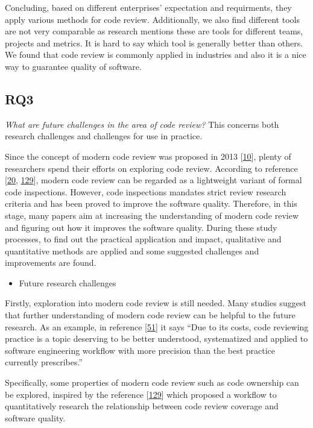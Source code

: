 \documentclass[]{book}
\providecommand{\tightlist}{%
  \setlength{\itemsep}{0pt}\setlength{\parskip}{0pt}}
\begin{document}
Concluding, based on different enterprises' expectation and requirments,
they apply various methods for code review. Additionally, we also find
different tools are not very comparable as research mentions these are
tools for different teams, projects and metrics. It is hard to say which
tool is generally better than others. We found that code review is
commonly applied in industries and also it is a nice way to guarantee
quality of software.

\subsection{RQ3}\label{rq3}

\emph{What are future challenges in the area of code review?} This
concerns both research challenges and challenges for use in practice.

Since the concept of modern code review was proposed in 2013
{[}\protect\hyperlink{ref-bacchelli2013expectations}{10}{]}, plenty of
researchers spend their efforts on exploring code review. According to
reference {[}\protect\hyperlink{ref-beller2014modern}{20},
\protect\hyperlink{ref-mcintosh2014impact}{129}{]}, modern code review
can be regarded as a lightweight variant of formal code inspections.
However, code inspections mandates strict review research criteria and
has been proved to improve the software quality. Therefore, in this
stage, many papers aim at increasing the understanding of modern code
review and figuring out how it improves the software quality. During
these study processes, to find out the practical application and impact,
qualitative and quantitative methods are applied and some suggested
challenges and improvements are found.

\begin{itemize}
\tightlist
\item
  Future research challenges
\end{itemize}

Firstly, exploration into modern code review is still needed. Many
studies suggest that further understanding of modern code review can be
helpful to the future research. As an example, in reference
{[}\protect\hyperlink{ref-czerwonka2015code}{51}{]} it says ``Due to its
costs, code reviewing practice is a topic deserving to be better
understood, systematized and applied to software engineering workflow
with more precision than the best practice currently prescribes.''

Specifically, some properties of modern code review such as code
ownership can be explored, inspired by the reference
{[}\protect\hyperlink{ref-mcintosh2014impact}{129}{]} which proposed a
workflow to quantitatively research the relationship between code review
coverage and software quality.
\end{document}
